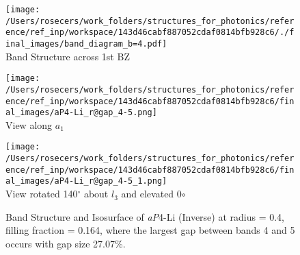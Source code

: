 \begin{figure}[H]
\begin{minipage}{0.5\textwidth}\centering
\texttt{[image: /Users/rosecers/work\_folders/structures\_for\_photonics/reference/ref\_inp/workspace/143d46cabf887052cdaf0814bfb928c6/./final\_images/band\_diagram\_b=4.pdf]}
\\Band Structure across 1st BZ
\end{minipage}\hfill
\begin{minipage}{0.25\textwidth}\centering
\texttt{[image: /Users/rosecers/work\_folders/structures\_for\_photonics/reference/ref\_inp/workspace/143d46cabf887052cdaf0814bfb928c6/final\_images/aP4-Li\_r@gap\_4-5.png]}
\\View along $a_1$ 
\end{minipage}\hfill
\begin{minipage}{0.23\textwidth}\centering
\texttt{[image: /Users/rosecers/work\_folders/structures\_for\_photonics/reference/ref\_inp/workspace/143d46cabf887052cdaf0814bfb928c6/final\_images/aP4-Li\_r@gap\_4-5\_1.png]}
\\View rotated 140$^{\circ}$ about $l_3$  and elevated 0${\circ}$
\end{minipage}\hfill\caption{Band Structure and Isosurface of \textit{aP}4-Li (Inverse) at radius = 0.4, filling fraction = 0.164, where the largest gap between bands 4 and 5 occurs with gap size 27.07\%.}

\end{figure}
\vspace{-0.25in}

